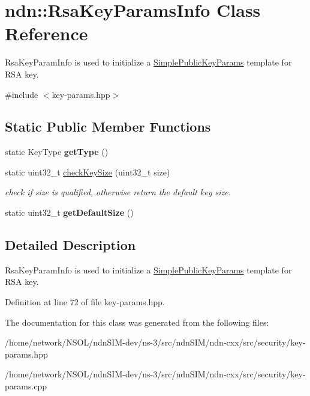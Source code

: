 \hypertarget{classndn_1_1RsaKeyParamsInfo}{}\section{ndn\+:\+:Rsa\+Key\+Params\+Info Class Reference}
\label{classndn_1_1RsaKeyParamsInfo}


Rsa\+Key\+Param\+Info is used to initialize a \hyperlink{classndn_1_1SimplePublicKeyParams}{Simple\+Public\+Key\+Params} template for R\+SA key.  




{\ttfamily \#include $<$key-\/params.\+hpp$>$}

\subsection*{Static Public Member Functions}
\begin{DoxyCompactItemize}
\item 
static Key\+Type {\bfseries get\+Type} ()\hypertarget{classndn_1_1RsaKeyParamsInfo_a9022d857e5c63f672beccc729cefdea0}{}\label{classndn_1_1RsaKeyParamsInfo_a9022d857e5c63f672beccc729cefdea0}

\item 
static uint32\+\_\+t \hyperlink{classndn_1_1RsaKeyParamsInfo_aa1896e53ae09195ab3d8ee2e31660705}{check\+Key\+Size} (uint32\+\_\+t size)\hypertarget{classndn_1_1RsaKeyParamsInfo_aa1896e53ae09195ab3d8ee2e31660705}{}\label{classndn_1_1RsaKeyParamsInfo_aa1896e53ae09195ab3d8ee2e31660705}

\begin{DoxyCompactList}\small\item\em check if size is qualified, otherwise return the default key size. \end{DoxyCompactList}\item 
static uint32\+\_\+t {\bfseries get\+Default\+Size} ()\hypertarget{classndn_1_1RsaKeyParamsInfo_aa578b1dc399644dd402a20ea80d9bf8f}{}\label{classndn_1_1RsaKeyParamsInfo_aa578b1dc399644dd402a20ea80d9bf8f}

\end{DoxyCompactItemize}


\subsection{Detailed Description}
Rsa\+Key\+Param\+Info is used to initialize a \hyperlink{classndn_1_1SimplePublicKeyParams}{Simple\+Public\+Key\+Params} template for R\+SA key. 

Definition at line 72 of file key-\/params.\+hpp.



The documentation for this class was generated from the following files\+:\begin{DoxyCompactItemize}
\item 
/home/network/\+N\+S\+O\+L/ndn\+S\+I\+M-\/dev/ns-\/3/src/ndn\+S\+I\+M/ndn-\/cxx/src/security/key-\/params.\+hpp\item 
/home/network/\+N\+S\+O\+L/ndn\+S\+I\+M-\/dev/ns-\/3/src/ndn\+S\+I\+M/ndn-\/cxx/src/security/key-\/params.\+cpp\end{DoxyCompactItemize}
